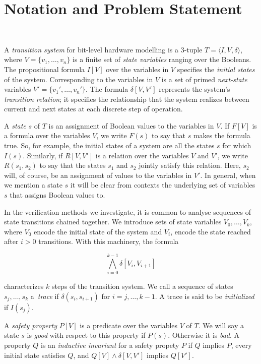 \section{Notation and Problem Statement}~\label{sec:notation}

A \textit{transition system} for bit-level hardware
modelling is a 3-tuple $T = \langle I,V,\delta \rangle$, where $V = \{v_1,\dots ,v_n\}$
is a finite set of \textit{state variables} ranging over the Booleans.
The propositional formula $I[V]$ over the variables in 
$V$ specifies the \textit{initial states} of the system. 
Corresponding to the variables in $V$ is a set of primed \textit{next-state} variables $V' = \{v_1', \dots, v_n'\}$.
The formula $\delta[V,V']$ represents the system's \textit{transition relation}; it specifies the relationship that the system realizes between current and next states at each discrete step of operation.

A \textit{state} $s$ of $T$ is an assignment of Boolean values to the variables in $V$.
If $F[V]$ is a formula over the variables $V$, we write $F(s)$ to say that $s$ makes the formula true.
So, for example, the initial states of a system are all the states $s$ for which $I(s)$. Similarly, if $R[V,V']$ is a relation over the variables $V$ and $V'$, we write $R(s_1,s_2)$ to say that the states $s_1$ and $s_2$ jointly satisfy this relation. Here, $s_2$ will, of course, be an assignment of values to the variables in $V'$. In general, when we mention a state $s$
it will be clear from contexts the underlying set of variables $s$ that assigns Boolean values to.

In the verification methods we investigate, it is common to analyse sequences of state transitions chained together.
We introduce sets of state variables $V_0, \dots, V_k$, where $V_0$ encode the initial state of the system and $V_i$, encode the state reached after $i>0$ transitions. With this machinery, the formula

\[ \bigwedge_{i{=}0}^{k{-}1}\delta[V_i, V_{i+1}]\] 

\noindent characterizes $k$ steps of the transition system.
We call a sequence of states $s_j,\dots,s_k$ a~\textit{trace}
if $\delta(s_i,s_{i{+}1})$ for $i=j,\dots,k{-}1$.  A trace is
said to be \textit{initialized} if $I(s_j)$.
  
A \textit{safety property} $P[V]$ is a predicate over the variables $V$ of $T$.  We will
say a state $s$ is \textit{good} with respect to this property if $P(s)$. Otherwise it is \textit{bad}.
A property $Q$ is an \textit{inductive invariant} for a safety propety $P$ if $Q$ implies $P$, every initial state satisfies $Q$, and $Q[V] \wedge \delta[V,V']$ implies $Q[V']$.

